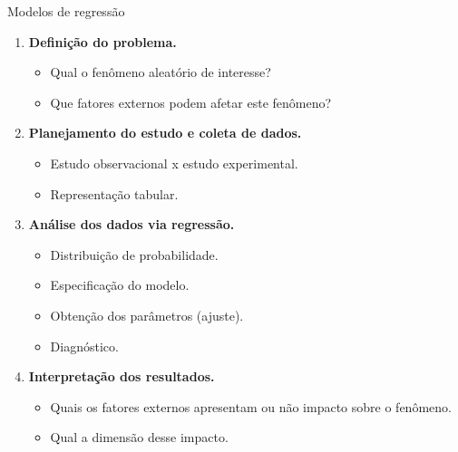 \documentclass[
  ignorenonframetext,
  serif,
  professionalfont,
  usenames,
  dvipsnames,
  aspectratio = 169]{beamer}
\providecommand{\tightlist}{%
  \setlength{\itemsep}{0pt}\setlength{\parskip}{0pt}}
\renewcommand{\tightlist}{%
  \setlength{\itemsep}{0\baselineskip}
  \setlength{\parskip}{0.25\baselineskip}
}
\def\endColumns{\end{minipage}}%
\def\beginAHalfColumnT{\begin{minipage}[t]{0.49\textwidth}}%
\begin{document}
\begin{frame}{Modelos de regressão}
\protect\hypertarget{modelos-de-regressuxe3o-5}{}
\beginAHalfColumnT

\begin{enumerate}
\tightlist
\item
  \textbf{Definição do problema.}

  \begin{itemize}
  \tightlist
  \item
    Qual o fenômeno aleatório de interesse?
  \item
    Que fatores externos podem afetar este fenômeno?
  \end{itemize}
\item
  \textbf{Planejamento do estudo e coleta de dados.}

  \begin{itemize}
  \tightlist
  \item
    Estudo observacional x estudo experimental.
  \item
    Representação tabular.
  \end{itemize}
\end{enumerate}

\endColumns
\beginAHalfColumnT

\begin{enumerate}
\setcounter{enumi}{2}
\tightlist
\item
  \textbf{Análise dos dados via regressão.}

  \begin{itemize}
  \tightlist
  \item
    Distribuição de probabilidade.
  \item
    Especificação do modelo.
  \item
    Obtenção dos parâmetros (ajuste).
  \item
    Diagnóstico.
  \end{itemize}
\item
  \textbf{Interpretação dos resultados.}

  \begin{itemize}
  \tightlist
  \item
    Quais os fatores externos apresentam ou não impacto sobre o
    fenômeno.
  \item
    Qual a dimensão desse impacto.
  \end{itemize}
\end{enumerate}

\endColumns
\end{frame}
\end{document}
